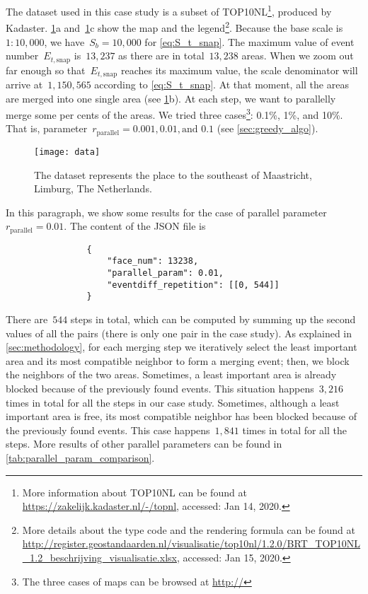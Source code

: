 \documentclass[ijgi,article,submit,moreauthors,pdftex]{Definitions/mdpi}
\begin{document}
The dataset used in this case study is a subset of TOP10NL\footnote{%
More information about TOP10NL can be found at
\url{https://zakelijk.kadaster.nl/-/topnl},
accessed: Jan 14, 2020.},
produced by Kadaster.
%
\figs\ref{fig:data}a and~\ref{fig:data}c show the map and the legend\footnote{%
More details about the type code and the rendering formula can be found at
\url{http://register.geostandaarden.nl/visualisatie/top10nl/1.2.0/BRT_TOP10NL_1.2_beschrijving_visualisatie.xlsx},
accessed: Jan 15, 2020.}.
%
Because the base scale is $1:10{,}000$, 
we have~$S_b = 10{,}000$ for \eq\ref{eq:S_t_snap}.
The maximum value of event number~$E_{t,\mathrm{snap}}$ is~$13{,}237$
as there are in total~$13{,}238$ areas.
When we zoom out far enough 
so that~$E_{t,\mathrm{snap}}$ reaches its maximum value,
the scale denominator will arrive at~$1{,}150{,}565$
according to \eq\ref{eq:S_t_snap}.
At that moment, all the areas are merged into one single area
(see \figs\ref{fig:data}b).
At each step, we want to parallelly merge some per cents of the areas.
We tried three cases\footnote{%
The three cases of maps can be browsed at
\url{http://}}: 
0.1\%, 1\%, and 10\%.
That is, parameter~$r_\mathrm{parallel}=0.001, 0.01, \text{and~} 0.1$ 
(see \sect\ref{sec:greedy_algo}).

\begin{figure}[tb]
\centering
\texttt{[image: data]}
\caption{The dataset represents the place 
    to the southeast of Maastricht, Limburg, The Netherlands.}
\label{fig:data}
\end{figure}

In this paragraph, we show some results for the case of 
parallel parameter~$r_\mathrm{parallel}= 0.01$.
The content of the JSON file is 
\begin{verbatim}
                {
                    "face_num": 13238,
                    "parallel_param": 0.01,                    
                    "eventdiff_repetition": [[0, 544]]
                }
\end{verbatim}
There are~$544$ steps in total, 
which can be computed by summing up the second values of all the pairs
(there is only one pair in the case study).
%
As explained in \sect\ref{sec:methodology}, 
for each merging step we iteratively select the least important area 
and its most compatible neighbor to form a merging event; 
then, we block the neighbors of the two areas.
Sometimes, a least important area is already blocked 
because of the previously found events.
This situation happens~$3{,}216$ times in total for all the steps
in our case study.
%
Sometimes, although a least important area is free, 
its most compatible neighbor has been blocked 
because of the previously found events.
This case happens~$1{,}841$ times in total for all the steps.
%
More results of other parallel parameters 
can be found in \tbl\ref{tab:parallel_param_comparison}.
\end{document}
